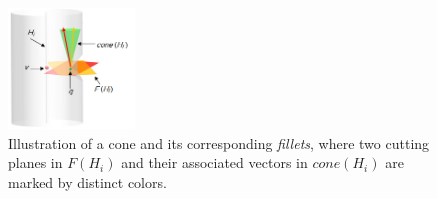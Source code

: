 









\begin{figure}[b]
  \centering
  \includegraphics[width=0.3\textwidth]{figs/cone-fillet.png}
  \caption{\label{fig:fillets}%
           Illustration of a cone and its corresponding \emph{fillets}, where two cutting planes in $F(H_i)$ and their associated vectors in $cone(H_i)$ are marked by distinct colors.}
\end{figure}


